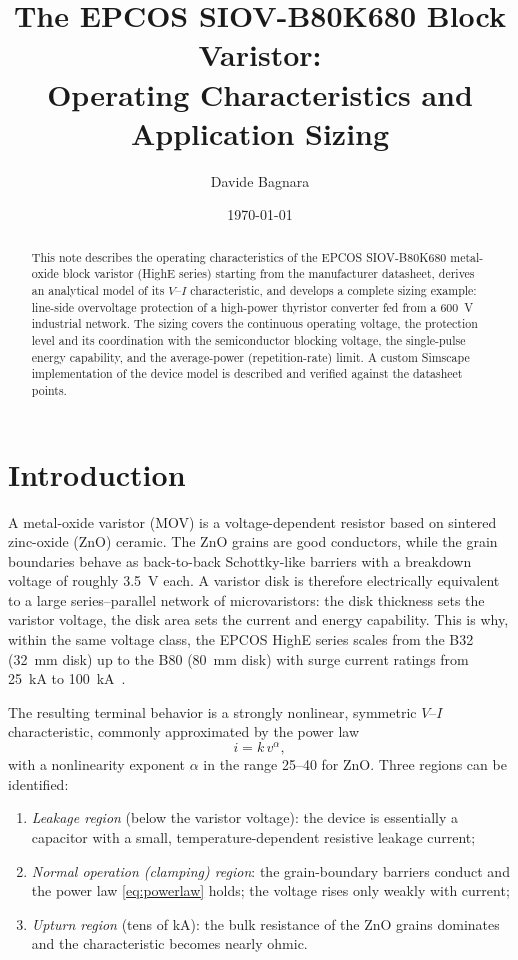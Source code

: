 \documentclass[11pt,a4paper]{article}
\title{The EPCOS SIOV-B80K680 Block Varistor:\\
Operating Characteristics and Application Sizing}
\author{Davide Bagnara}
\date{\today}
\begin{document}
\maketitle

\begin{abstract}
This note describes the operating characteristics of the EPCOS SIOV-B80K680
metal-oxide block varistor (HighE series) starting from the manufacturer
datasheet, derives an analytical model of its $V$--$I$ characteristic, and
develops a complete sizing example: line-side overvoltage protection of a
high-power thyristor converter fed from a \SI{600}{\volt} industrial network.
The sizing covers the continuous operating voltage, the protection level and
its coordination with the semiconductor blocking voltage, the single-pulse
energy capability, and the average-power (repetition-rate) limit. A custom
Simscape implementation of the device model is described and verified
against the datasheet points.
\end{abstract}

\section{Introduction}

A metal-oxide varistor (MOV) is a voltage-dependent resistor based on
sintered zinc-oxide (ZnO) ceramic. The ZnO grains are good conductors, while
the grain boundaries behave as back-to-back Schottky-like barriers with a
breakdown voltage of roughly \SI{3.5}{\volt} each. A varistor disk is
therefore electrically equivalent to a large series--parallel network of
microvaristors: the disk thickness sets the varistor voltage, the disk area
sets the current and energy capability. This is why, within the same voltage
class, the EPCOS HighE series scales from the B32 (\SI{32}{\milli\meter}
disk) up to the B80 (\SI{80}{\milli\meter} disk) with surge current ratings
from \SI{25}{\kilo\ampere} to \SI{100}{\kilo\ampere}~\cite{epcos2002,epcos_gti}.

The resulting terminal behavior is a strongly nonlinear, symmetric $V$--$I$
characteristic, commonly approximated by the power law
%
\begin{equation}
  i = k\,v^{\alpha},
  \label{eq:powerlaw}
\end{equation}
%
with a nonlinearity exponent $\alpha$ in the range 25--40 for ZnO. Three
regions can be identified:
%
\begin{enumerate}
  \item \emph{Leakage region} (below the varistor voltage): the device is
  essentially a capacitor with a small, temperature-dependent resistive
  leakage current;
  \item \emph{Normal operation (clamping) region}: the grain-boundary
  barriers conduct and the power law \eqref{eq:powerlaw} holds; the voltage
  rises only weakly with current;
  \item \emph{Upturn region} (tens of \si{\kilo\ampere}): the bulk resistance
  of the ZnO grains dominates and the characteristic becomes nearly ohmic.
\end{enumerate}
\end{document}
